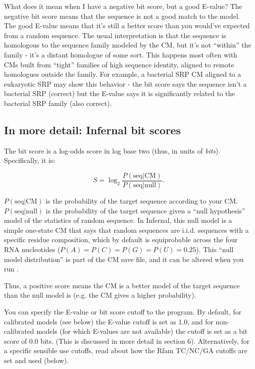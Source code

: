 \begin{srefaq}{What does it mean when I have a negative bit score,
    but a good E-value?} The negative bit score means that the sequence is
  not a good match to the model. The good E-value means that it's still
  a better score than you would've expected from a random sequence. The
  usual interpretation is that the sequence is homologous to the
  sequence family modeled by the CM, but it's not ``within'' the family
  - it's a distant homologue of some sort. This happens most often with
  CMs built from ``tight'' families of high sequence identity, aligned
  to remote homologues outside the family. For example, a bacterial SRP
  CM aligned to a eukaryotic SRP may show this behavior - the bit
  score says the sequence isn't a bacterial SRP (correct) but the E-value says
  it is significantly related to the bacterial SRP family (also correct).
\end{srefaq}

\subsection{In more detail: Infernal bit scores}

The bit score is a log-odds score in log base two (thus, in units of
{\em bits}). Specifically, it is:

\[
S = \log_2 \frac {P( \mbox{seq} | \mbox{CM})} { P (\mbox{seq} |
  \mbox{null})}.
\]

$P( \mbox{seq} | \mbox{CM})$ is the probability of the target
sequence according to your CM. $ P (\mbox{seq} | \mbox{null}) $ is
the probability of the target sequence given a ``null hypothesis''
model of the statistics of random sequence. In Infernal, this null model
is a simple one-state CM that says that random sequences are i.i.d.
sequences with a specific residue composition, which by default is
equiprobable across the four RNA nucleotides ($P(A) = P(C) = P(G) =
P(U) = 0.25$). This ``null model distribution'' is part of the CM save
file, and it can be altered when you run .

Thus, a positive score means the CM is a better model of the target
sequence than the null model is (e.g. the CM gives a higher
probability).

You can specify the E-value or bit score cutoff to the 
program. By default, for calibrated models (see below) the E-value
cutoff is set as 1.0, and for non-calibrated models (for which
E-values are not available) the cutoff is set as a bit score of 0.0
bits. (This is discussed in more detail in section 6). Alternatively,
for a specific sensible use cutoffs, read about how the Rfam
TC/NC/GA cutoffs are set and used (below).


